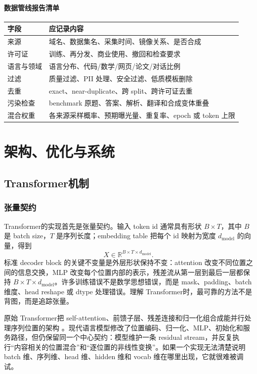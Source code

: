 \documentclass[UTF8,zihao=-4,openany]{ctexbook}
\newcommand{\Transformer}{Transformer}
\begin{document}
\subsection{数据管线报告清单}
\begin{center}
\begin{tabular}{p{}p{}}
\toprule
字段 & 应记录内容 \\
\midrule
来源 & 域名、数据集名、采集时间、镜像关系、是否合成 \\
许可证 & 训练、再分发、商业使用、撤回和检查要求 \\
语言与领域 & 语言分布、代码/数学/网页/论文/对话比例 \\
过滤 & 质量过滤、PII 处理、安全过滤、低质模板删除 \\
去重 & exact、near-duplicate、跨 split、跨许可证去重 \\
污染检查 & benchmark 原题、答案、解析、翻译和合成变体重叠 \\
混合权重 & 各来源采样概率、预期曝光量、重复率、epoch 或 token 上限 \\
\bottomrule
\end{tabular}
\end{center}

\part{架构、优化与系统}

\chapter{\Transformer 机制}
\section{张量契约}
\Transformer 的实现首先是张量契约。输入 token id 通常具有形状 $B\times T$，其中 $B$ 是 batch size，$T$ 是序列长度；embedding table 把每个 id 映射为宽度 $d_{\mathrm{model}}$ 的向量，得到
\[
X\in\mathbb{R}^{B\times T\times d_{\mathrm{model}}}.
\]
标准 decoder block 的关键不变量是外层形状保持不变：attention 改变不同位置之间的信息交换，MLP 改变每个位置内部的表示，残差流从第一层到最后一层都保持 $B\times T\times d_{\mathrm{model}}$。许多训练错误不是数学思想错误，而是 mask、padding、batch 维度、head reshape 或 dtype 处理错误。理解 \Transformer 时，最可靠的方法不是背图，而是追踪张量。

原始 \Transformer 把 self-attention、前馈子层、残差连接和归一化组合成能并行处理序列位置的架构 \cite{vaswani2017attention}。现代语言模型修改了位置编码、归一化、MLP、初始化和服务路径，但仍保留同一个中心契约：模型维护一条 residual stream，并反复执行“内容相关的位置混合”和“逐位置的非线性变换”。如果一个实现无法清楚说明 batch 维、序列维、head 维、hidden 维和 vocab 维在哪里出现，它就很难被调试。
\end{document}
